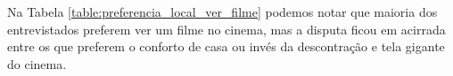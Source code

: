 \documentclass[12pt]{article}
\begin{document}
        \begin{table}[h]
            \centering
            \caption{Preferência de local para ver filme}
            \label{table:preferencia_local_ver_filme}
        \end{table}
        \FloatBarrier
    
        Na Tabela \ref{table:preferencia_local_ver_filme} podemos notar que maioria dos entrevistados preferem ver um filme no cinema, mas a disputa ficou em acirrada entre os que preferem o conforto de casa ou invés da descontração e tela gigante do cinema.
\end{document}
